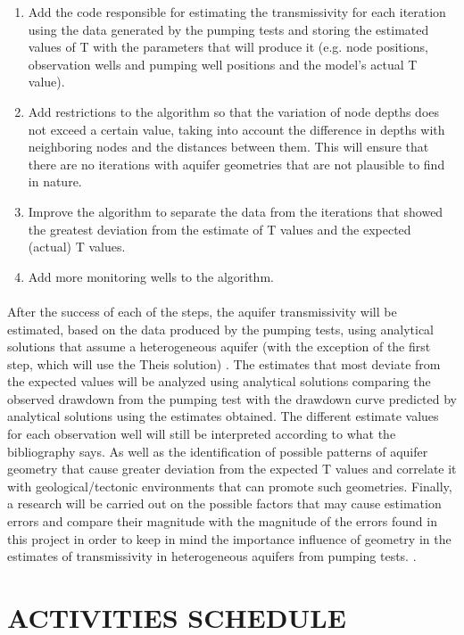 \documentclass[11pt, a4paper]{article}
\begin{document}
\begin{enumerate}
            \item Add the code responsible for estimating the transmissivity for each iteration using the data generated by the pumping tests and storing the estimated values of T with the parameters that will produce it (e.g. node positions, observation wells and pumping well positions and the model's actual T value).
            \item Add restrictions to the algorithm so that the variation of node depths does not exceed a certain value, taking into account the difference in depths with neighboring nodes and the distances between them. This will ensure that there are no iterations with aquifer geometries that are not plausible to find in nature.
            \item Improve the algorithm to separate the data from the iterations that showed the greatest deviation from the estimate of T values and the expected (actual) T values.
            \item Add more monitoring wells to the algorithm.
        \end{enumerate}
    \paragraph{} %
    After the success of each of the steps, the aquifer transmissivity will be estimated, based on the data produced by the pumping tests, using analytical solutions that assume a heterogeneous aquifer (with the exception of the first step, which will use the Theis solution) . The estimates that most deviate from the expected values will be analyzed using analytical solutions comparing the observed drawdown from the pumping test with the drawdown curve predicted by analytical solutions using the estimates obtained. The different estimate values for each observation well will still be interpreted according to what the bibliography says. As well as the identification of possible patterns of aquifer geometry that cause greater deviation from the expected T values and correlate it with geological/tectonic environments that can promote such geometries. Finally, a research will be carried out on the possible factors that may cause estimation errors and compare their magnitude with the magnitude of the errors found in this project in order to keep in mind the importance influence of geometry in the estimates of transmissivity in heterogeneous aquifers from pumping tests. .
    
    \section{ACTIVITIES SCHEDULE} %
\end{document}
